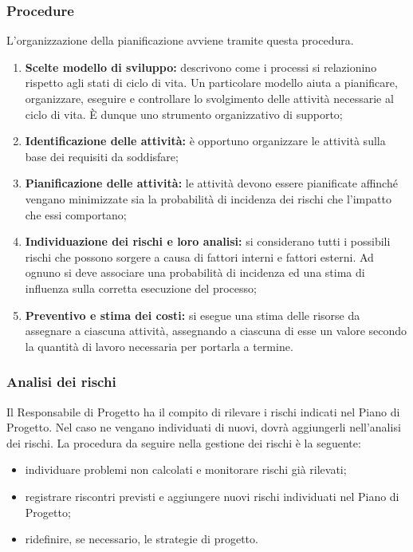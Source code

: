 \documentclass[11pt,a4paper]{article}
\begin{document}
\subsubsection{Procedure}

L’organizzazione della pianificazione avviene tramite questa procedura.

\begin{enumerate}
	\item \textbf{Scelte modello di sviluppo:} descrivono come i processi si relazionino rispetto agli stati di ciclo di vita. Un particolare modello aiuta a pianificare, organizzare, eseguire e controllare lo svolgimento delle attività necessarie al ciclo di vita. È dunque uno strumento organizzativo di supporto;
	\item \textbf{Identificazione delle attività:} è opportuno organizzare le attività sulla base dei requisiti da soddisfare;
	\item \textbf{Pianificazione delle attività:} le attività devono essere pianificate affinché vengano minimizzate sia la probabilità di incidenza dei rischi che l'impatto che essi comportano;
	\item \textbf{Individuazione dei rischi e loro analisi:} si considerano tutti i possibili rischi che possono sorgere a causa di fattori interni e fattori esterni. Ad ognuno si deve associare una probabilità di incidenza ed una stima di influenza sulla corretta esecuzione del processo;
	\item \textbf{Preventivo e stima dei costi:} si esegue una stima delle risorse da assegnare a ciascuna attività, assegnando a ciascuna di esse un valore secondo la quantità di lavoro necessaria per portarla a termine.
\end{enumerate}

\subsubsection{Analisi dei rischi}

Il Responsabile di Progetto ha il compito di rilevare i rischi indicati nel Piano di Progetto. Nel caso ne vengano individuati di nuovi, dovrà aggiungerli nell'analisi dei rischi. La procedura da seguire nella gestione dei rischi è la seguente:
\begin{itemize}
	\item individuare problemi non calcolati e monitorare rischi già rilevati;
	\item registrare riscontri previsti e aggiungere nuovi rischi individuati nel Piano di Progetto;
	\item ridefinire, se necessario, le strategie di progetto.
\end{itemize}
\end{document}
